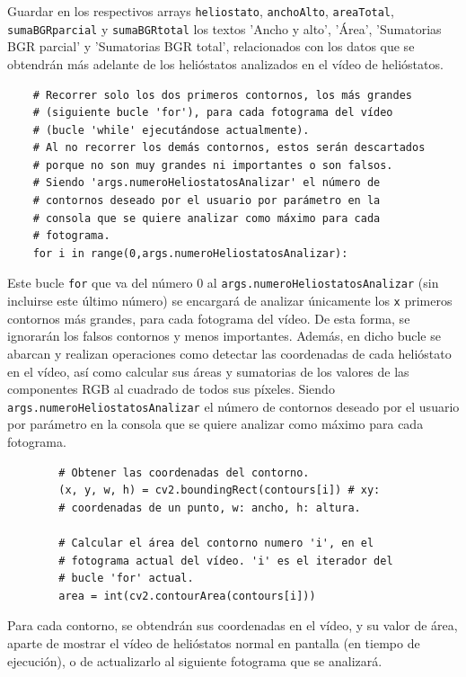     Guardar en los respectivos arrays \verb|heliostato|, \verb|anchoAlto|, \verb|areaTotal|, \verb|sumaBGRparcial| y \verb|sumaBGRtotal| los textos 'Ancho y alto', 'Área', 'Sumatorias BGR parcial' y 'Sumatorias BGR total', relacionados con los datos que se obtendrán más adelante de los helióstatos analizados en el vídeo de helióstatos.\\[20pt]

\begin{lstlisting}
    # Recorrer solo los dos primeros contornos, los más grandes
    # (siguiente bucle 'for'), para cada fotograma del vídeo
    # (bucle 'while' ejecutándose actualmente).
    # Al no recorrer los demás contornos, estos serán descartados
    # porque no son muy grandes ni importantes o son falsos.
    # Siendo 'args.numeroHeliostatosAnalizar' el número de
    # contornos deseado por el usuario por parámetro en la
    # consola que se quiere analizar como máximo para cada
    # fotograma.
    for i in range(0,args.numeroHeliostatosAnalizar):
\end{lstlisting}

Este bucle \verb|for| que va del número 0 al \verb|args.numeroHeliostatosAnalizar| (sin incluirse este último número) se encargará de analizar únicamente los \verb|x| primeros contornos más grandes, para cada fotograma del vídeo. De esta forma, se ignorarán los falsos contornos y menos importantes. Además, en dicho bucle se abarcan y realizan operaciones como detectar las coordenadas de cada helióstato en el vídeo, así como calcular sus áreas y sumatorias de los valores de las componentes RGB al cuadrado de todos sus píxeles. Siendo \verb|args.numeroHeliostatosAnalizar| el número de contornos deseado por el usuario por parámetro en la consola que se quiere analizar como máximo para cada fotograma.\\[20pt]        
        
\begin{lstlisting}
        # Obtener las coordenadas del contorno.
        (x, y, w, h) = cv2.boundingRect(contours[i]) # xy:
        # coordenadas de un punto, w: ancho, h: altura.

        # Calcular el área del contorno numero 'i', en el
        # fotograma actual del vídeo. 'i' es el iterador del
        # bucle 'for' actual.
        area = int(cv2.contourArea(contours[i]))
\end{lstlisting}
        
Para cada contorno, se obtendrán sus coordenadas en el vídeo, y su valor de área, aparte de mostrar el vídeo de helióstatos normal en pantalla (en tiempo de ejecución), o de actualizarlo al siguiente fotograma que se analizará.

